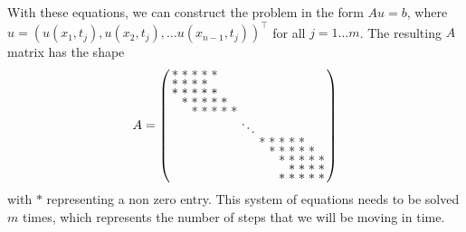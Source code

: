 \documentclass[00main.tex]{subfiles}
\begin{document}
With these equations, we can construct the problem in the form $Au=b$, where $u = (u(x_1,t_j), u(x_2,t_j), \hdots u(x_{n-1}, t_j))^\top$ for all $j = 1 \hdots m$. The resulting $A$ matrix has the shape \[ \arraycolsep=1.4pt\def\arraystretch{.6} A = \left( \begin{array}{ccccccccccccccc}
* & * & * & * & * &  &  & & & & & & & & \\
* & * & * & * &  &  &  & & & & & & & & \\
* & * & * & * & * &  &  & & & & & & & & \\
 & * & * & * & * & * &  & & & & & & & & \\
 & & * & * & * & * & * &  & & & & & & & \\
 & & & & & & & \ddots & & & & & & & \\
 & & & & & & &  & * & * & * & * & * & & \\
 & & & & & & & &  & * & * & * & * & * & \\
 & & & & & & & &  &  & * & * & * & * & *\\
 & & & & & & & &  &  &  & * & * & * & *\\
 & & & & & & & &  &  & * & * & * & * & *\\
\end{array} \right) \] with $*$ representing a non zero entry. This system of equations needs to be solved $m$ times, which represents the number of steps that we will be moving in time.
\end{document}
